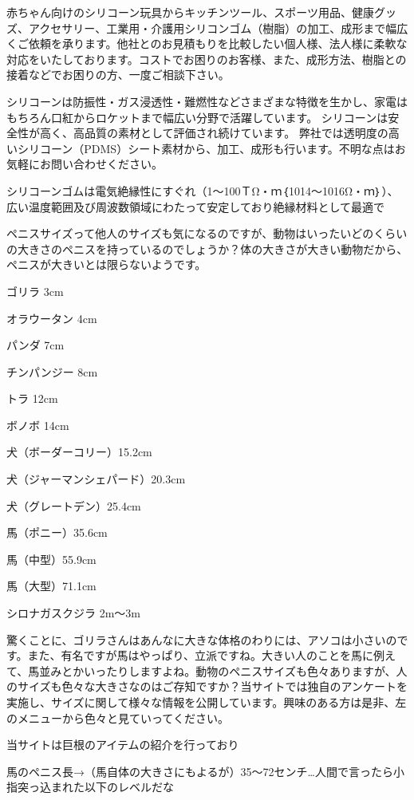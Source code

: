 赤ちゃん向けのシリコーン玩具からキッチンツール、スポーツ用品、健康グッズ、アクセサリー、工業用・介護用シリコンゴム（樹脂）の加工、成形まで幅広くご依頼を承ります。他社とのお見積もりを比較したい個人様、法人様に柔軟な対応をいたしております。コストでお困りのお客様、また、成形方法、樹脂との接着などでお困りの方、一度ご相談下さい。

シリコーンは防振性・ガス浸透性・難燃性などさまざまな特徴を生かし、家電はもちろん口紅からロケットまで幅広い分野で活躍しています。
シリコーンは安全性が高く、高品質の素材として評価され続けています。 弊社では透明度の高いシリコーン（PDMS）シート素材から、加工、成形も行います。不明な点はお気軽にお問い合わせください。

シリコーンゴムは電気絶縁性にすぐれ（1～100ＴΩ・ｍ｛1014～1016Ω・ｍ｝）、広い温度範囲及び周波数領域にわたって安定しており絶縁材料として最適で


    ペニスサイズって他人のサイズも気になるのですが、動物はいったいどのくらいの大きさのペニスを持っているのでしょうか？体の大きさが大きい動物だから、ペニスが大きいとは限らないようです。

    ゴリラ 3cm

    オラウータン 4cm

    パンダ 7cm

    チンパンジー 8cm

    トラ 12cm

    ボノボ 14cm

    犬（ボーダーコリー）15.2cm

    犬（ジャーマンシェパード）20.3cm

    犬（グレートデン）25.4cm

    馬（ポニー）35.6cm

    馬（中型）55.9cm

    馬（大型）71.1cm

    シロナガスクジラ 2m～3m


    驚くことに、ゴリラさんはあんなに大きな体格のわりには、アソコは小さいのです。また、有名ですが馬はやっぱり、立派ですね。大きい人のことを馬に例えて、馬並みとかいったりしますよね。動物のペニスサイズも色々ありますが、人のサイズも色々な大きさなのはご存知ですか？当サイトでは独自のアンケートを実施し、サイズに関して様々な情報を公開しています。興味のある方は是非、左のメニューから色々と見ていってください。

当サイトは巨根のアイテムの紹介を行っており

馬のペニス長→（馬自体の大きさにもよるが）35～72センチ…人間で言ったら小指突っ込まれた以下のレベルだな

